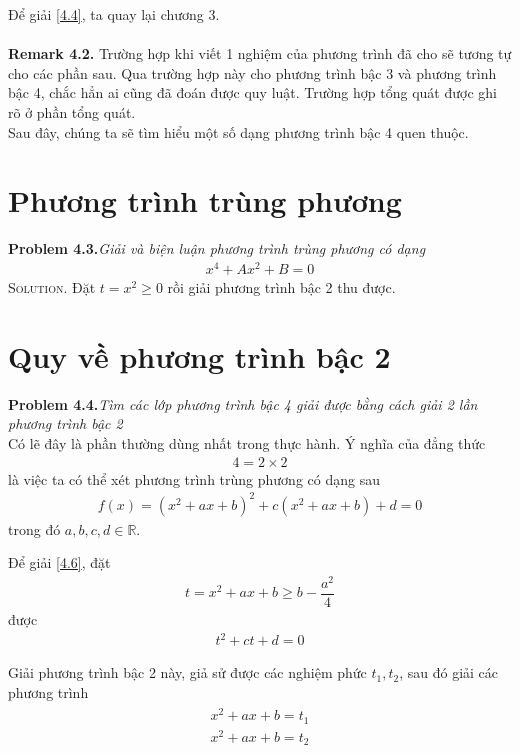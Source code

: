 \documentclass[a4paper,oneside]{book}
\numberwithin{equation}{chapter}
\begin{document}
Để giải \eqref{4.4}, ta quay lại chương 3.\\
\\
\textbf{Remark 4.2. } Trường hợp khi viết 1 nghiệm của phương trình đã cho sẽ tương tự cho các phần sau. Qua trường hợp này cho phương trình bậc 3 và phương trình bậc 4, chắc hẳn ai cũng đã đoán được quy luật. Trường hợp tổng quát được ghi rõ ở phần tổng quát.\\

Sau đây, chúng ta sẽ tìm hiểu một số dạng phương trình bậc 4 quen thuộc.
\section{Phương trình trùng phương}
\textbf{Problem 4.3.}\textit{Giải và biện luận phương trình trùng phương có dạng}
\begin{align}
{x^4} + A{x^2} + B = 0
\end{align}
\textsc{Solution.} Đặt $t = {x^2} \ge 0$ rồi giải phương trình bậc 2 thu được.
\section{Quy về phương trình bậc 2}
\textbf{Problem 4.4.}\textit{Tìm các lớp phương trình bậc 4 giải được bằng cách giải 2 lần phương trình bậc 2}\\

Có lẽ đây là phần thường dùng nhất trong thực hành. Ý nghĩa của đẳng thức
\begin{align}
4 =2 \times 2
\end{align}
là việc ta có thể xét phương trình trùng phương có dạng sau 
\begin{align}
\label{4.6}
f\left( x \right) = {\left( {{x^2} + ax + b} \right)^2} + c\left( {{x^2} + ax + b} \right) + d = 0
\end{align}
trong đó $a,b,c,d \in \mathbb{R}$.

Để giải \eqref{4.6}, đặt 
\begin{align}
t = {x^2} + ax + b \ge b - \dfrac{{{a^2}}}{4}
\end{align}
được 
\begin{align}
{t^2} + ct + d = 0
\end{align}

Giải phương trình bậc 2 này, giả sử được các nghiệm phức ${t_1},{t_2}$, sau đó giải các phương trình
\begin{align}
\begin{array}{l}
{x^2} + ax + b = {t_1}\\
{x^2} + ax + b = {t_2}
\end{array}
\end{align}
\end{document}

